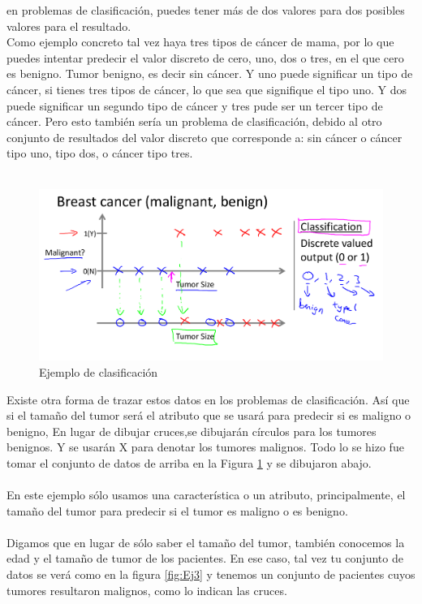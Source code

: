\documentclass{report}
\begin{document}
en problemas de clasificación, puedes tener más de dos valores para dos
posibles valores para el resultado.\\ Como ejemplo concreto tal vez haya tres
tipos de cáncer de mama, por lo que puedes intentar predecir el valor discreto de cero,
uno, dos o tres, en el que cero es benigno. Tumor benigno, es decir sin cáncer. Y uno puede
significar un tipo de cáncer, si tienes tres tipos de cáncer, lo que sea que signifique
el tipo uno. Y dos puede significar un segundo tipo de cáncer y tres pude ser un tercer tipo de
cáncer. Pero esto también sería un problema de clasificación, debido al otro
conjunto de resultados del valor discreto que corresponde a: sin cáncer o cáncer tipo
uno, tipo dos, o cáncer tipo tres.\\\\

\begin{figure}
	\includegraphics[scale=0.35]{img/Ej2}
	\caption{Ejemplo de clasificación}
	\label{fig:Ej2}
\end{figure}

Existe otra forma de trazar estos datos
en los problemas de clasificación.  Así que si el tamaño del tumor será
el atributo que se usará para predecir si es maligno o benigno, En lugar de dibujar cruces,se dibujarán círculos para los tumores benignos. Y se usarán X para denotar los tumores malignos. Todo lo se hizo fue tomar el conjunto de datos de arriba en la Figura \ref{fig:Ej2} y se dibujaron abajo.\\\\ En este ejemplo sólo usamos una característica o un atributo, principalmente, el tamaño del tumor para predecir si el tumor es maligno o es benigno.\\ \\

Digamos que en lugar de sólo saber el tamaño del tumor, también conocemos la
edad y el tamaño de tumor de los pacientes. En ese caso, tal vez tu conjunto de datos se verá como en la figura \ref{fig:Ej3} y tenemos un conjunto de pacientes cuyos tumores resultaron malignos, como lo indican las cruces.\\
\end{document}
